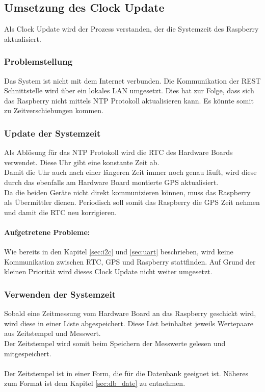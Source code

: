 \subsection{Umsetzung des Clock Update}
Als Clock Update wird der Prozess verstanden, der die Systemzeit des Raspberry aktualisiert.

\subsubsection{Problemstellung}
Das System ist nicht mit dem Internet verbunden. Die Kommunikation der REST Schnittstelle wird über ein lokales LAN umgesetzt. Dies hat zur Folge, dass sich das Raspberry nicht mittels NTP Protokoll aktualisieren kann. Es könnte somit zu Zeitverschiebungen kommen.

\subsubsection{Update der Systemzeit}
Als Ablösung für das NTP Protokoll wird die RTC des Hardware Boards verwendet. Diese Uhr gibt eine konstante Zeit ab.\\
Damit die Uhr auch nach einer längeren Zeit immer noch genau läuft, wird diese durch das ebenfalls am Hardware Board montierte GPS aktualisiert.\\
Da die beiden Geräte nicht direkt kommunizieren können, muss das Raspberry als Übermittler dienen. Periodisch soll somit das Raspberry die GPS Zeit nehmen und damit die RTC neu korrigieren.
\paragraph{Aufgetretene Probleme:} Wie bereits in den Kapitel \ref{sec:i2c} und \ref{sec:uart} beschrieben, wird keine Kommunikation zwischen RTC, GPS und Raspberry stattfinden. Auf Grund der kleinen Priorität wird dieses Clock Update nicht weiter umgesetzt.

\subsubsection{Verwenden der Systemzeit}
Sobald eine Zeitmessung vom Hardware Board an das Raspberry geschickt wird, wird diese in einer Liste abgespeichert. Diese List beinhaltet jeweils Wertepaare aus Zeitstempel und Messwert.\\
Der Zeitstempel wird somit beim Speichern der Messwerte gelesen und mitgespeichert.\\
\\
Der Zeitstempel ist in einer Form, die für die Datenbank geeignet ist. Näheres zum Format ist dem Kapitel \ref{sec:db_date} zu entnehmen.